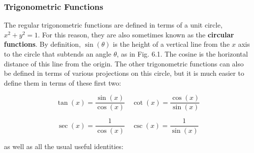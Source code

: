 \documentclass[11pt,titlepage]{article}
\numberwithin{equation}{section}
\begin{document}
\subsubsection{Trigonometric Functions}



The regular trigonometric functions are defined in terms of a unit circle, $x^{2}+y^{2}=1$. For this reason, they are also sometimes known as the \textbf{circular functions}. By definition, $\sin(\theta)$ is the height of a vertical line from the $x$ axis to the circle that subtends an angle $\theta$, as in Fig. 6.1. The cosine is the horizontal distance of this line from the origin. The other trigonometric functions can also be defined in terms of various projections on this circle, but it is much easier to define them in terms of these first two:

\begin{equation}
\tan(x)=\frac{\sin(x)}{\cos(x)} \quad \cot(x)=\frac{\cos(x)}{\sin(x)}
\end{equation}

\begin{equation}
\sec(x)=\frac{1}{\cos(x)} \quad \csc(x)=\frac{1}{\sin(x)}
\end{equation}

as well as all the usual useful identities:
\end{document}
